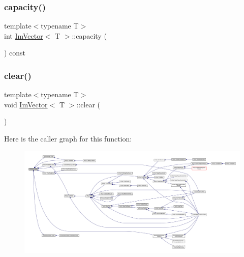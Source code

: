 \subsubsection{\texorpdfstring{capacity()}{capacity()}}
{\footnotesize\ttfamily template$<$typename T$>$ \\
int \mbox{\hyperlink{class_im_vector}{Im\+Vector}}$<$ T $>$\+::capacity (\begin{DoxyParamCaption}{ }\end{DoxyParamCaption}) const\hspace{0.3cm}{\ttfamily [inline]}}

\mbox{\label{class_im_vector_ae2d401b4ec5f1113cdb8edb5a61a38f7}} 
\subsubsection{\texorpdfstring{clear()}{clear()}}
{\footnotesize\ttfamily template$<$typename T$>$ \\
void \mbox{\hyperlink{class_im_vector}{Im\+Vector}}$<$ T $>$\+::clear (\begin{DoxyParamCaption}{ }\end{DoxyParamCaption})\hspace{0.3cm}{\ttfamily [inline]}}

Here is the caller graph for this function\+:
\nopagebreak
\begin{figure}[H]
\begin{center}
\leavevmode
\includegraphics[width=350pt]{class_im_vector_ae2d401b4ec5f1113cdb8edb5a61a38f7_icgraph}
\end{center}
\end{figure}
\mbox{\label{class_im_vector_a8d3d5f3462afbf38d9e8f410ebd085ee}} 
